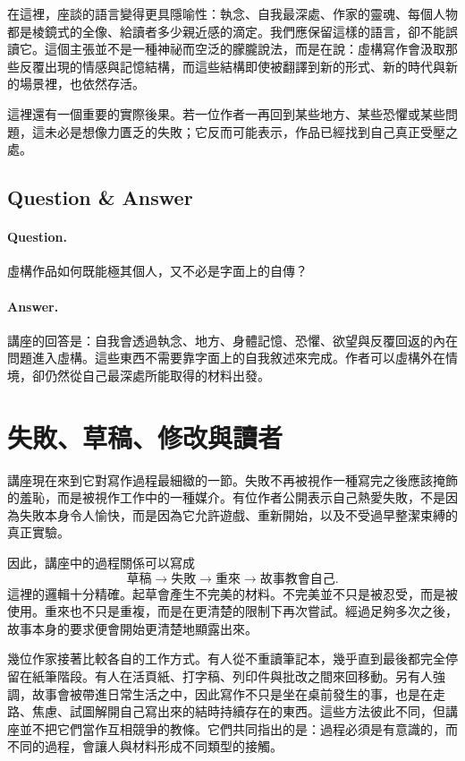 在這裡，座談的語言變得更具隱喻性：執念、自我最深處、作家的靈魂、每個人物都是棱鏡式的全像、給讀者多少親近感的滴定。我們應保留這樣的語言，卻不能誤讀它。這個主張並不是一種神祕而空泛的朦朧說法，而是在說：虛構寫作會汲取那些反覆出現的情感與記憶結構，而這些結構即使被翻譯到新的形式、新的時代與新的場景裡，也依然存活。

這裡還有一個重要的實際後果。若一位作者一再回到某些地方、某些恐懼或某些問題，這未必是想像力匱乏的失敗；它反而可能表示，作品已經找到自己真正受壓之處。

\subsection{Question \& Answer}

\paragraph{Question.} 虛構作品如何既能極其個人，又不必是字面上的自傳？

\paragraph{Answer.} 講座的回答是：自我會透過執念、地方、身體記憶、恐懼、欲望與反覆回返的內在問題進入虛構。這些東西不需要靠字面上的自我敘述來完成。作者可以虛構外在情境，卻仍然從自己最深處所能取得的材料出發。

\section{失敗、草稿、修改與讀者}

講座現在來到它對寫作過程最細緻的一節。失敗不再被視作一種寫完之後應該掩飾的羞恥，而是被視作工作中的一種媒介。有位作者公開表示自己熱愛失敗，不是因為失敗本身令人愉快，而是因為它允許遊戲、重新開始，以及不受過早整潔束縛的真正實驗。

因此，講座中的過程關係可以寫成
\begin{equation}
\text{草稿} \to \text{失敗} \to \text{重來} \to \text{故事教會自己}.
\end{equation}
這裡的邏輯十分精確。起草會產生不完美的材料。不完美並不只是被忍受，而是被使用。重來也不只是重複，而是在更清楚的限制下再次嘗試。經過足夠多次之後，故事本身的要求便會開始更清楚地顯露出來。

幾位作家接著比較各自的工作方式。有人從不重讀筆記本，幾乎直到最後都完全停留在紙筆階段。有人在活頁紙、打字稿、列印件與批改之間來回移動。另有人強調，故事會被帶進日常生活之中，因此寫作不只是坐在桌前發生的事，也是在走路、焦慮、試圖解開自己寫出來的結時持續存在的東西。這些方法彼此不同，但講座並不把它們當作互相競爭的教條。它們共同指出的是：過程必須是有意識的，而不同的過程，會讓人與材料形成不同類型的接觸。

